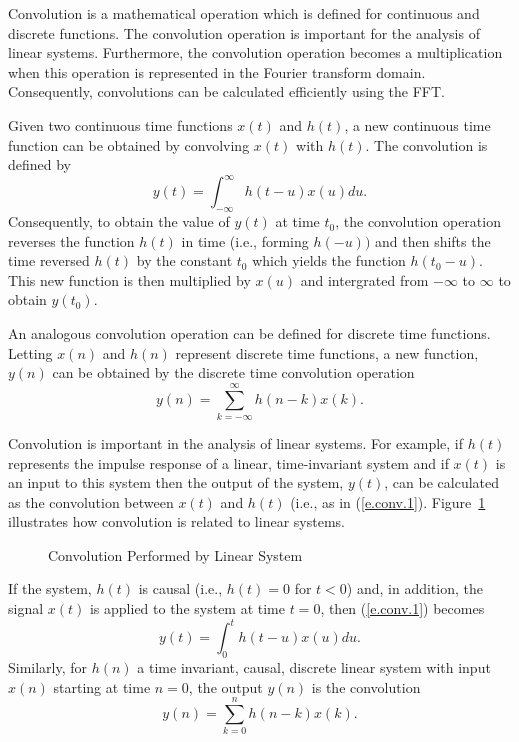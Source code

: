 	Convolution is a mathematical operation which
is defined for continuous and discrete functions.  The
convolution operation is important for the
analysis of linear systems.  Furthermore, the convolution
operation becomes a multiplication when this operation
is represented in the Fourier transform domain.  Consequently,
convolutions can be calculated efficiently using the  FFT.

	Given two continuous time functions $x(t)$ and $h(t)$,
a new continuous time function can be obtained by
convolving $x(t)$ with $h(t)$.  The convolution is
defined by
%
\begin{equation}
y(t)=\int_{-\infty}^{\infty}h(t-u)x(u)du.
\label{e.conv.1}
\end{equation}
%
Consequently, to obtain the value of $y(t)$ at time
$t_0$, the convolution operation reverses the function $h(t)$
in time (i.e., forming $h(-u))$ and then shifts the time
reversed $h(t)$ by the constant $t_0$ which yields the function
$h(t_0-u)$.  This new function is then multiplied by $x(u)$ and intergrated
from $-\infty$ to $\infty$ to obtain $y(t_0)$.

	An analogous convolution operation
can be defined for discrete time functions.  Letting
$x(n)$ and $h(n)$ represent discrete time functions, a
new function, $y(n)$ can be obtained by the discrete time convolution
operation
%
\begin{equation}
y(n)=\sum_{k=-\infty}^{\infty}h(n-k)x(k).
\label{e.conv.2}
\end{equation}
%

	Convolution is important in the analysis
of linear systems.  For example, if $h(t)$ represents the
impulse response of a linear, time-invariant system and if $x(t)$ 
is an input to this system then the output of the system, $y(t)$,
can be calculated as the convolution
between $x(t)$ and $h(t)$ (i.e., as in (\ref{e.conv.1}).
Figure~\ref{f.conv.1} illustrates how convolution is related to 
linear systems.
%
\begin{figure}[tb]
\caption{ Convolution Performed by Linear System}
\label{f.conv.1}
\end{figure}
%
If the system, $h(t)$ is causal (i.e., $h(t)=0$ for $t<0$)
and, in addition, the signal $x(t)$ is applied to the system at
time $t=0$, then (\ref{e.conv.1}) becomes
%
\begin{equation}
y(t)=\int_{0}^{t}h(t-u)x(u)du.
\label{e.conv.3}
\end{equation}
%
Similarly, for $h(n)$ a time invariant, causal, discrete linear
system
with input $x(n)$ starting at time $n=0$, 
the output $y(n)$ is the convolution
%
\begin{equation}
y(n)=\sum_{k=0}^{n}h(n-k)x(k).
\label{e.conv.4}
\end{equation}
%

